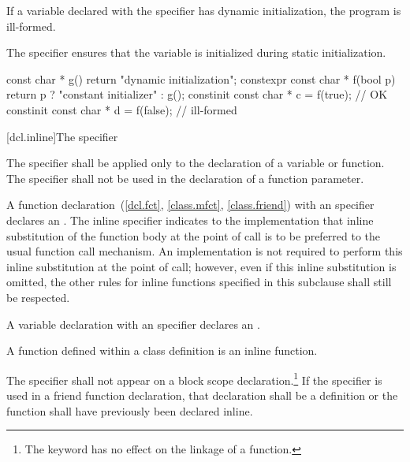 \pnum
If a variable declared with the  specifier has
dynamic initialization, the program is ill-formed.
\begin{note}
The  specifier ensures that the variable
is initialized during static initialization.
\end{note}

\pnum
\begin{example}
\begin{codeblock}
const char * g() { return "dynamic initialization"; }
constexpr const char * f(bool p) { return p ? "constant initializer" : g(); }
constinit const char * c = f(true);     // OK
constinit const char * d = f(false);    // ill-formed
\end{codeblock}
\end{example}

[dcl.inline]{The  specifier}%

\pnum
The  specifier shall be applied only to the declaration
of a variable or function. The  specifier shall not be used in the declaration
of a function parameter.

\pnum
{}%
%
A function declaration~(\ref{dcl.fct}, \ref{class.mfct},
\ref{class.friend}) with an  specifier declares an
. The inline specifier indicates to
the implementation that inline substitution of the function body at the
point of call is to be preferred to the usual function call mechanism.
An implementation is not required to perform this inline substitution at
the point of call; however, even if this inline substitution is omitted,
the other rules for inline functions specified in this subclause shall
still be respected.

\pnum
A variable declaration with an  specifier declares an
.

\pnum
A function defined within a class definition is an inline function.

\pnum
The  specifier shall not appear on a block scope
declaration.\footnote{The  keyword has no effect on the linkage of a function.}
If the  specifier is used in a friend function declaration, that
declaration shall be a definition or the function shall have previously
been declared inline.

